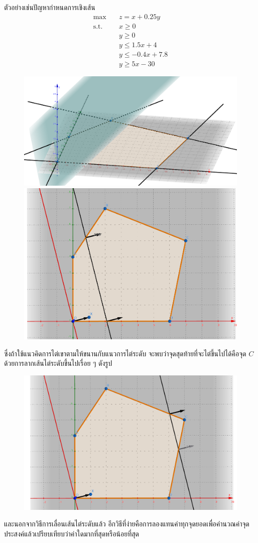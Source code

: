 ตัวอย่างเช่นปัญหากำหนดการเชิงเส้น
\begin{align*}
\max  &\quad z=x+0.25y \\
\text{s.t.} &\quad x\geq0\\
            &\quad y\geq0\\
            &\quad y\leq1.5x+4\\
            &\quad y\leq-0.4x+7.8\\
            &\quad y\geq5x-30
\end{align*}
\begin{figure}[h]
    \centering
    \includegraphics[width=0.45\linewidth]{example2.png}
    \includegraphics[width=0.45\linewidth]{Example3.png}
\end{figure}

ซึ่งถ้าใช้แนวคิดการไต่เขาตามให้ขนานกับแนวการไต่ระดับ จะพบว่าจุดสุดท้ายที่จะไต่ขึ้นไปได้คือจุด $C$ ด้วยการลากเส้นไต่ระดับขึ้นไปเรื่อย ๆ ดังรูป
\begin{figure}[h]
    \centering
    \includegraphics[width=0.75\linewidth]{Example4.png}
\end{figure}
และนอกจากวิธีการเลื่อนเส้นไต่ระดับแล้ว อีกวิธีที่ง่ายคือการลองแทนค่าทุกจุดยอดเพื่อคำนวณค่าจุดประสงค์แล้วเปรียบเทียบว่าค่าใดมากที่สุดหรือน้อยที่สุด

